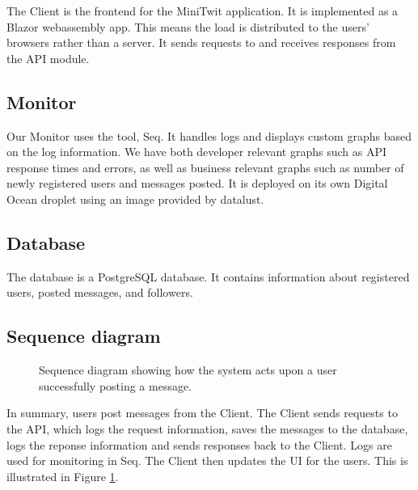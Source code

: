 The Client is the frontend for the MiniTwit application.
It is implemented as a Blazor webassembly app.
This means the load is distributed to the users' browsers 
rather than a server.
It sends requests to and receives responses from the API module.

\subsection{Monitor}

Our Monitor uses the tool, Seq\cite{seq}.
It handles logs and displays custom graphs based on 
the log information. We have both developer relevant 
graphs such as API response times and errors,
as well as business relevant graphs such as number 
of newly registered users and messages posted.
It is deployed on its own Digital Ocean droplet 
using an image provided by datalust\cite{seq}.

\subsection{Database}

The database is a PostgreSQL\cite{postgres} database.
It contains information about registered users,
posted messages, and followers.

\subsection{Sequence diagram}

\begin{figure}[H]
    \centering
    \caption{Sequence diagram showing how the system acts upon 
    a user successfully posting a message.}
    \label{fig:seq_diagram}
\end{figure}

In summary, users post messages from the Client.
The Client sends requests to the API, which logs the request 
information, saves the messages to the database, 
logs the reponse information and sends responses back to the 
Client. Logs are used for monitoring in Seq. 
The Client then updates the UI for the users.
This is illustrated in Figure \ref{fig:seq_diagram}.
